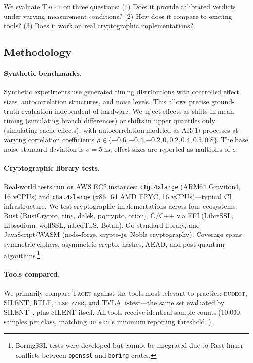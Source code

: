 \documentclass[letterpaper,twocolumn,10pt]{article}
\newcommand{\tacet}{\textsc{Tacet}\xspace}
\newcommand{\dudect}{\textsc{dudect}\xspace}
\newcommand{\tlsfuzzer}{\textsc{tlsfuzzer}\xspace}
\newcommand{\rtlf}{\textsc{RTLF}\xspace}
\newcommand{\silent}{\textsc{SILENT}\xspace}
\newcommand{\ns}[1]{\SI{#1}{\nano\second}}
\begin{document}
We evaluate \tacet on three questions: (1) Does it provide calibrated verdicts
under varying measurement conditions? (2) How does it compare to existing tools?
(3) Does it work on real cryptographic implementations?

\subsection{Methodology}
\label{sec:evaluation:methodology}

\paragraph{Synthetic benchmarks.}
Synthetic experiments use generated timing distributions with controlled effect
sizes, autocorrelation structures, and noise levels. This allows precise ground-truth
evaluation independent of hardware. We inject effects as shifts in mean timing
(simulating branch differences) or shifts in upper quantiles only (simulating
cache effects), with autocorrelation modeled as AR(1) processes at varying
correlation coefficients $\rho \in \{-0.6, -0.4, -0.2, 0, 0.2, 0.4, 0.6, 0.8\}$.
The base noise standard deviation is $\sigma = \ns{5}$; effect sizes are
reported as multiples of $\sigma$.

\paragraph{Cryptographic library tests.}
Real-world tests run on AWS EC2 instances: \texttt{c8g.4xlarge} (ARM64 Graviton4,
16 vCPUs) and \texttt{c8a.4xlarge} (x86\_64 AMD EPYC, 16 vCPUs)—typical CI
infrastructure. We test cryptographic implementations across four ecosystems:
Rust (RustCrypto, ring, dalek, pqcrypto, orion), C/C++ via FFI (LibreSSL, Libsodium,
wolfSSL, mbedTLS, Botan), Go standard library, and JavaScript/WASM (node-forge,
crypto-js, Noble cryptography). Coverage spans symmetric ciphers, asymmetric crypto,
hashes, AEAD, and post-quantum algorithms.\footnote{BoringSSL tests were developed
but cannot be integrated due to Rust linker conflicts between \texttt{openssl}
and \texttt{boring} crates.}

\paragraph{Tools compared.}
We primarily compare \tacet against the tools most relevant to practice:
\dudect, \silent, \rtlf, \tlsfuzzer, and TVLA~t-test---the same set evaluated
by \silent~\cite{silent}, plus \silent itself.
All tools receive identical sample counts (10,000 samples per class,
matching \dudect's minimum reporting threshold~\cite{dudect}).
\end{document}
